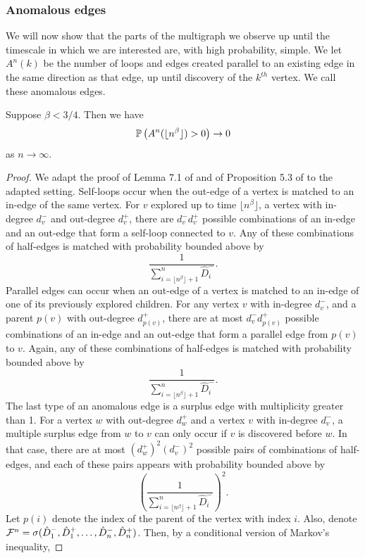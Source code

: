 \subsubsection{Anomalous edges}
We will now show that the parts of the multigraph we observe up until the timescale in which we are interested are, with high probability, simple. We let $A^n(k)$ be the number of loops and edges created parallel to an existing edge in the same direction as that edge, up until discovery of the $k^{th}$ vertex. We call these anomalous edges. 
\begin{proposition}\label{prop.anomalousedges}
Suppose $\beta<3/4$. Then we have 
$$\P\left(A^n(\lfloor n^\beta \rfloor)>0\right)\to 0$$
as $n\to \infty$.
\end{proposition}
\begin{proof}
We adapt the proof of Lemma 7.1 of \cite{Joseph2014} and of Proposition 5.3 of \cite{Conchon2018} to the adapted setting. Self-loops occur when the out-edge of a vertex is matched to an in-edge of the same vertex.  For $v$ explored up to time $\lfloor n^\beta\rfloor$, a vertex with in-degree $d^-_v$ and out-degree $d^+_v$, there are $d^-_v d^+_v$ possible combinations of an in-edge and an out-edge that form a self-loop connected to $v$. Any of these combinations of half-edges is matched with probability bounded above by 
$$\frac{1}{\sum_{i=\lfloor n^\beta \rfloor+1}^n\hat{D}^-_i}.$$
Parallel edges can occur when an out-edge of a vertex is matched to an in-edge of one of its previously explored children. For any vertex $v$ with in-degree $d^-_v$, and a parent $p(v)$ with out-degree $d^+_{p(v)}$, there are at most $d^-_v d^+_{p(v)}$ possible combinations of an in-edge and an out-edge that form a parallel edge from $p(v)$ to $v$. Again, any of these combinations of half-edges is matched with probability bounded above by 
$$\frac{1}{\sum_{i=\lfloor n^\beta \rfloor+1}^n \hat{D}^-_i}.$$
The last type of an anomalous edge is a surplus edge with multiplicity greater than 1. For a vertex $w$ with out-degree $d^+_w$ and a vertex $v$ with in-degree $d^-_v$, a multiple surplus edge from $w$ to $v$ can only occur if $v$ is discovered before $w$. In that case, there are at most $(d^+_w)^2(d^-_v)^2$ possible pairs of combinations of half-edges, and each of these pairs appears with probability bounded above by
$$\left(\frac{1}{\sum_{i=\lfloor n^\beta \rfloor+1}^n \hat{D}^-_i}\right)^2.$$
Let $p(i)$ denote the index of the parent of the vertex with index $i$. Also, denote $\cF^n=\sigma(\hat{D}^-_1,\hat{D}^+_1,\dots,\hat{D}^-_n,\hat{D}^+_n)$. Then, by a conditional version of Markov's inequality, 


\end{proof}
